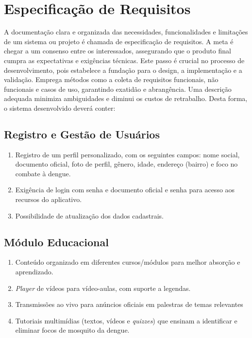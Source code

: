 \documentclass[a5paper, 12pt]{article}
\begin{document}
\newpage
\section{Especificação de Requisitos}\label{sec:requisitos}

A documentação clara e organizada das necessidades, funcionalidades e limitações de um sistema ou projeto é chamada de especificação de requisitos.  A meta é chegar a um consenso entre os interessados, assegurando que o produto final cumpra as expectativas e exigências técnicas.  Este passo é crucial no processo de desenvolvimento, pois estabelece a fundação para o design, a implementação e a validação.  Emprega métodos como a coleta de requisitos funcionais, não funcionais e casos de uso, garantindo exatidão e abrangência.  Uma descrição adequada minimiza ambiguidades e diminui os custos de retrabalho. Desta forma, o sistema desenvolvido deverá conter:

\subsection{Registro e Gestão de Usuários}
\begin{enumerate}
    \item Registro de um perfil personalizado, com os seguintes campos: nome social, documento oficial, foto de perfil, gênero, idade, endereço (bairro) e foco no combate à dengue.
    \item Exigência de login com senha e documento oficial e senha para acesso aos recursos do aplicativo.
    \item Possibilidade de atualização dos dados cadastrais.
\end{enumerate}

\subsection{Módulo Educacional}
\begin{enumerate}
    \item Conteúdo organizado em diferentes cursos/módulos para melhor absorção e aprendizado.
    \item \textit{Player} de vídeos para vídeo-aulas, com suporte a legendas.
    \item Transmissões ao vivo para anúncios oficiais em palestras de temas relevantes
    \item Tutoriais multimídias (textos, vídeos e \textit{quizzes}) que ensinam a identificar e eliminar focos de mosquito da dengue.
\end{enumerate}
\end{document}
